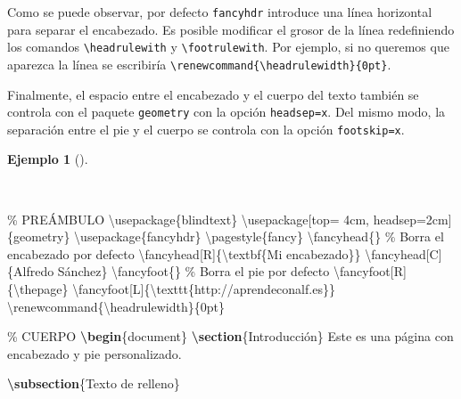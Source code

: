 \documentclass[
  spanish,
  a4paper,
]{scrreport}
\newenvironment{Shaded}{\begin{snugshade}}{\end{snugshade}}
\newcommand{\BuiltInTok}[1]{\textcolor[rgb]{0.00,0.23,0.31}{#1}}
\newcommand{\CommentTok}[1]{\textcolor[rgb]{0.37,0.37,0.37}{#1}}
\newcommand{\ExtensionTok}[1]{\textcolor[rgb]{0.00,0.23,0.31}{#1}}
\newcommand{\FunctionTok}[1]{\textcolor[rgb]{0.28,0.35,0.67}{#1}}
\newcommand{\KeywordTok}[1]{\textcolor[rgb]{0.00,0.23,0.31}{\textbf{#1}}}
\newcommand{\NormalTok}[1]{\textcolor[rgb]{0.00,0.23,0.31}{#1}}
\theoremstyle{definition}
\newtheorem{example}{Ejemplo}[chapter]
\theoremstyle{remark}
\begin{document}
Como se puede observar, por defecto \texttt{fancyhdr} introduce una
línea horizontal para separar el encabezado. Es posible modificar el
grosor de la línea redefiniendo los comandos
\texttt{\textbackslash{}headrulewith} y
\texttt{\textbackslash{}footrulewith}. Por ejemplo, si no queremos que
aparezca la línea se escribiría
\texttt{\textbackslash{}renewcommand\{\textbackslash{}headrulewidth\}\{0pt\}}.

Finalmente, el espacio entre el encabezado y el cuerpo del texto también
se controla con el paquete \texttt{geometry} con la opción
\texttt{headsep=x}. Del mismo modo, la separación entre el pie y el
cuerpo se controla con la opción \texttt{footskip=x}.

\begin{example}[]\protect\hypertarget{exm-encabezado-pie-2}{}\label{exm-encabezado-pie-2}

~

\begin{Shaded}
\begin{Highlighting}[]
\CommentTok{\% PREÁMBULO}
\BuiltInTok{\textbackslash{}usepackage}\NormalTok{\{}\ExtensionTok{blindtext}\NormalTok{\}}
\BuiltInTok{\textbackslash{}usepackage}\NormalTok{[top= 4cm, headsep=2cm]\{}\ExtensionTok{geometry}\NormalTok{\}}
\BuiltInTok{\textbackslash{}usepackage}\NormalTok{\{}\ExtensionTok{fancyhdr}\NormalTok{\}}
\FunctionTok{\textbackslash{}pagestyle}\NormalTok{\{fancy\}}
\FunctionTok{\textbackslash{}fancyhead}\NormalTok{\{\} }\CommentTok{\% Borra el encabezado por defecto}
\FunctionTok{\textbackslash{}fancyhead}\NormalTok{[R]\{}\FunctionTok{\textbackslash{}textbf}\NormalTok{\{Mi encabezado\}\}}
\FunctionTok{\textbackslash{}fancyhead}\NormalTok{[C]\{Alfredo Sánchez\}}
\FunctionTok{\textbackslash{}fancyfoot}\NormalTok{\{\} }\CommentTok{\% Borra el pie por defecto}
\FunctionTok{\textbackslash{}fancyfoot}\NormalTok{[R]\{}\FunctionTok{\textbackslash{}thepage}\NormalTok{\}}
\FunctionTok{\textbackslash{}fancyfoot}\NormalTok{[L]\{}\FunctionTok{\textbackslash{}texttt}\NormalTok{\{http://aprendeconalf.es\}\}}
\FunctionTok{\textbackslash{}renewcommand}\NormalTok{\{}\ExtensionTok{\textbackslash{}headrulewidth}\NormalTok{\}\{0pt\}}

\CommentTok{\% CUERPO}
\KeywordTok{\textbackslash{}begin}\NormalTok{\{}\ExtensionTok{document}\NormalTok{\}}
\KeywordTok{\textbackslash{}section}\NormalTok{\{Introducción\}}
\NormalTok{Este es una página con encabezado y pie personalizado.}

\KeywordTok{\textbackslash{}subsection}\NormalTok{\{Texto de relleno\}}


\end{Highlighting}
\end{Shaded}
\end{example}
\end{document}
